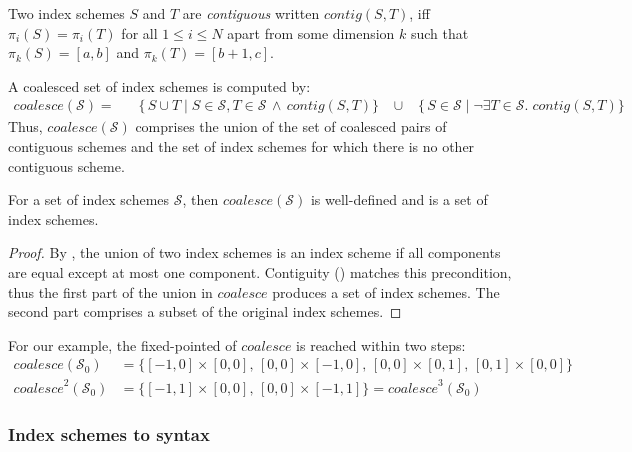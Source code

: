 \newcommand{\contig}[2]{\mathit{contig}(#1, #2)}
\begin{defn}[Contiguity]
  \label{def:contiguity}
  Two index schemes $S$ and $T$ are \emph{contiguous} written
  $\contig{S}{T}$, iff $\pi_i(S) = \pi_i(T)$ for all $1 \leq i \leq N$
  apart from some dimension $k$ such that $\pi_k(S) = [a, b]$ and
  $\pi_k(T) = [b+1, c]$.
\end{defn}
%
A coalesced set of index schemes is computed by:%
%
\begin{align*}
  \mathit{coalesce}(\mathcal{S}) = \; & \;\;
  \{\,S \cup T \mid S \in \mathcal{S}, T \in \mathcal{S} \, \wedge \,
                                        \contig{S}{T} \}
  \;\;\; \cup \;\;\;
  \{\,S \in \mathcal{S} \mid \neg \exists T \in \mathcal{S} . \; \contig{S}{T}\}
\end{align*}
%
Thus, $\mathit{coalesce}(\mathcal{S})$
comprises the union of the set of coalesced pairs of contiguous
schemes and the set of index schemes for which there is no other
contiguous scheme.
%
\begin{lemma}[Closure]
  For a set of index schemes $\mathcal{S}$, then
  $\mathit{coalesce}(\mathcal{S})$ is well-defined and is a set of
  index schemes.
\end{lemma}
\begin{proof}
  By , the union of two index schemes is an
  index scheme if all components are equal except at most one
  component. Contiguity () matches
  this precondition, thus the first part of the union in
  $\mathit{coalesce}$ produces a set of index schemes. The second part
  comprises a subset of the original index schemes.
\end{proof}
%
For our example, the fixed-pointed of $\mathit{coalesce}$ is reached within two
steps:
%
\begin{align*}
  \mathit{coalesce}(\mathcal{S}_0) & =
  \{[-1,0] \times [0,0],\,[0,0] \times [-1, 0],\,[0,0] \times
    [0,1],\,[0,1] \times [0,0]\} \\
  \mathit{coalesce}^2(\mathcal{S}_0) & =
  \{[-1, 1] \times [0, 0],\,[0, 0] \times [-1, 1]\} = \mathit{coalesce}^3(\mathcal{S}_0)
\end{align*}
%



\subsubsection{Index schemes to syntax}
